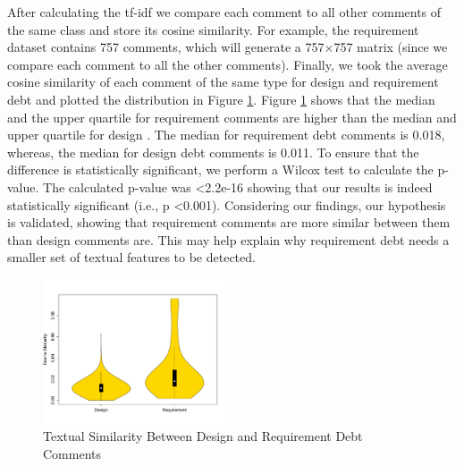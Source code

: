 
After calculating the tf-idf we compare each comment to all other comments of the same class and store its cosine similarity. For example, the requirement \SATD dataset contains 757 comments, which will generate a 757$\times$757 matrix (since we compare each comment to all the other comments). Finally, we took the average cosine similarity of each comment of the same type for design and requirement debt and plotted the distribution in Figure \ref{fig:textual_similarity}. Figure \ref{fig:textual_similarity} shows that the median and the upper quartile for requirement \SATD comments are higher than the median and upper quartile for design \SATD. The median for requirement debt comments is 0.018, whereas, the median for design debt comments is 0.011. To ensure that the difference is statistically significant, we perform a Wilcox test to calculate the p-value. The calculated p-value was \textless 2.2e-16 showing that our results is indeed statistically significant (i.e., p \textless 0.001). Considering our findings, our hypothesis is validated, showing that requirement \SATD comments are more similar between them than design \SATD comments are. This may help explain why requirement debt needs a smaller set of textual features to be detected.

\begin{figure}[t]
  \centering
  \includegraphics[width = 0.48\textwidth]{figures/textual_similarity_removing_stop_words.pdf}
  \vspace{-3mm}
  \caption{Textual Similarity Between Design and Requirement Debt Comments}
  \label{fig:textual_similarity}
\end{figure}

